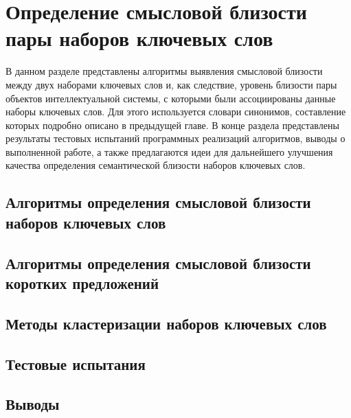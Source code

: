 \chapter{Определение смысловой близости пары наборов ключевых слов} \label{chapt1}
В данном разделе представлены алгоритмы выявления смысловой близости между двух наборами ключевых слов и, как следствие, уровень близости пары объектов интеллектуальной системы, с которыми были ассоциированы данные наборы ключевых слов.
Для этого используется словари синонимов, составление которых подробно описано в предыдущей главе.
В конце раздела представлены результаты тестовых испытаний программных реализаций алгоритмов, выводы о выполненной работе, а также предлагаются идеи для дальнейшего улучшения качества определения семантической близости наборов ключевых слов.

\section{Алгоритмы определения смысловой близости наборов ключевых слов}
\section{Алгоритмы определения смысловой близости коротких предложений}
\section{Методы кластеризации наборов ключевых слов}
\section{Тестовые испытания}
\section{Выводы}
